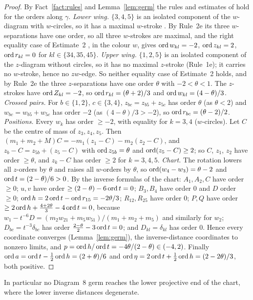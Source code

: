\begin{proof}
By Fact~\ref{fact:rules} and Lemma~\ref{lem:germ} the rules and estimates of \cite[\S3]{AK}
hold for the orders along $\gamma$.
\emph{Lower wing.}  $\{3,4,5\}$ is an isolated component of the $w$-diagram with $w$-circles,
so it has a maximal $w$-stroke \cite[Rule~1e, p.~546]{AK}.  By Rule~2e its three
$w$-separations have one order, so all three $w$-strokes are maximal, and the right equality
case of Estimate~2 \cite[p.~548]{AK}, in the colour $w$, gives $\operatorname{ord} w_{kl}=-2$,
$\operatorname{ord} z_{kl}=2$, $\operatorname{ord} r_{kl}=0$ for $kl\in\{34,35,45\}$.
\emph{Upper wing.}  $\{1,2,5\}$ is an isolated component of the $z$-diagram without circles, so
it has no maximal $z$-stroke (Rule~1e); it carries no $w$-stroke, hence no $zw$-edge.  So
neither equality case of Estimate~2 holds, and by Rule~2e the three $z$-separations have one
order $\theta$ with $-2<\theta<1$.  The $z$-strokes have $\operatorname{ord} Z_{kl}=-2$, so
$\operatorname{ord} r_{kl}=(\theta+2)/3$ and $\operatorname{ord} w_{kl}=(4-\theta)/3$.
\emph{Crossed pairs.}  For $b\in\{1,2\}$, $c\in\{3,4\}$, $z_{bc}=z_{b5}+z_{5c}$ has order
$\theta$ (as $\theta<2$) and $w_{bc}=w_{b5}+w_{5c}$ has order $-2$ (as $(4-\theta)/3>-2$), so
$\operatorname{ord} r_{bc}=(\theta-2)/2$.
\emph{Positions.}  Every $w_k$ has order $\ge-2$, with equality for $k=3,4$ ($w$-circles).  Let
$C$ be the centre of mass of $z_3,z_4,z_5$.  Then $(m_1+m_2+M)C=-m_1(z_1-C)-m_2(z_2-C)$, and
$z_b-C=z_{5b}+(z_5-C)$ with $\operatorname{ord} z_{5b}=\theta$ and $\operatorname{ord}(z_5-C)\ge2$; so $C$, $z_1$, $z_2$
have order $\ge\theta$, and $z_k-C$ has order $\ge2$ for $k=3,4,5$.
\emph{Chart.}  The rotation lowers all $z$-orders by $\theta$ and raises all $w$-orders by
$\theta$, so $\operatorname{ord}(w_4-w_3)=\theta-2$ and $\operatorname{ord} t=(2-\theta)/6>0$.  By the inverse formulas
of the chart: $A_1,A_2,C$ have order $\ge0$; $u,v$ have order $\ge(2-\theta)-6\operatorname{ord} t=0$; $B_3,B_4$
have order $0$ and $D$ order $\ge0$; $\operatorname{ord} h=2\operatorname{ord} t-\operatorname{ord} r_{15}=-2\theta/3$; $R_{12},R_{25}$
have order $0$; $P,Q$ have order $\ge2\operatorname{ord} h+\frac{4+2\theta}3-4\operatorname{ord} t=0$, because
$w_1-t^{-6}D=(m_2w_{21}+m_5w_{51})/(m_1+m_2+m_5)$ and similarly for $w_2$; $D_{bc}=t^{-3}\delta_{bc}$
has order $\frac{2-\theta}2-3\operatorname{ord} t=0$; and $D_{kl}=\delta_{kl}$ has order $0$.  Hence every
coordinate converges (Lemma~\ref{lem:germ}), the inverse-distance coordinates to nonzero limits,
and $p=\operatorname{ord} h/\operatorname{ord} t=-4\theta/(2-\theta)\in(-4,2)$.  Finally
$\operatorname{ord} a=\operatorname{ord} t-\frac12\operatorname{ord} h=(2+\theta)/6$ and $\operatorname{ord}\eta=2\operatorname{ord} t+\frac12\operatorname{ord} h=(2-2\theta)/3$,
both positive.
\end{proof}
In particular no Diagram~8 germ reaches the lower projective end of the chart, where the lower
inverse distances degenerate.

